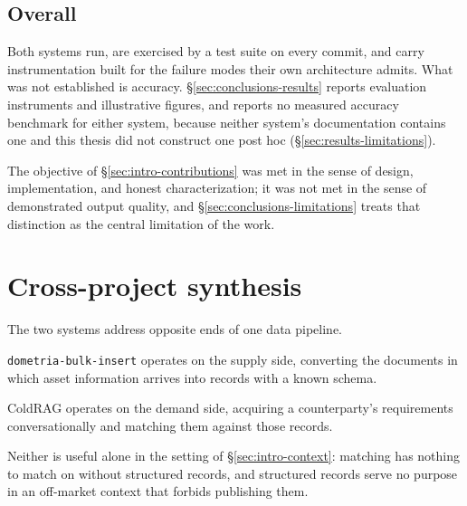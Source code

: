 \subsection{Overall}

Both systems run, are exercised by a test suite on every commit, and carry instrumentation built for the failure modes their own architecture admits. What was not established is accuracy. \S\ref{sec:conclusions-results} reports evaluation instruments and illustrative figures, and reports no measured accuracy benchmark for either system, because neither system's documentation contains one and this thesis did not construct one post hoc (\S\ref{sec:results-limitations}). 

\vspace{0.3cm}

The objective of \S\ref{sec:intro-contributions} was met in the sense of design, implementation, and honest characterization; it was not met in the sense of demonstrated output quality, and \S\ref{sec:conclusions-limitations} treats that distinction as the central limitation of the work.

\section{Cross-project synthesis}
\label{sec:conclusions-synthesis}

The two systems address opposite ends of one data pipeline. 

\vspace{0.3cm}

\texttt{dometria-bulk-insert} operates on the supply side, converting the documents in which asset information arrives into records with a known schema. 

\vspace{0.3cm}

ColdRAG operates on the demand side, acquiring a counterparty's requirements conversationally and matching them against those records. 

\vspace{0.3cm}

Neither is useful alone in the setting of \S\ref{sec:intro-context}: matching has nothing to match on without structured records, and structured records serve no purpose in an off-market context that forbids publishing them.

\vspace{0.3cm}

